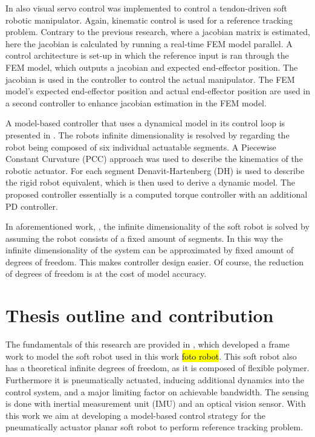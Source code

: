 In \cite{zhang2017visual} also visual servo control was implemented to control a tendon-driven soft robotic manipulator. Again, kinematic control is used for a reference tracking problem. Contrary to the previous research, where a jacobian matrix is estimated, here the jacobian is calculated by running a real-time FEM model parallel. A control architecture is set-up in which the reference input is ran through the FEM model, which outputs a jacobian and expected end-effector position. The jacobian is used in the controller to control the actual manipulator. The FEM model's expected end-effector position and actual end-effector position are used in a second controller to enhance jacobian estimation in the FEM model.

A model-based controller that uses a dynamical model in its control loop is presented in \cite{della2020model}. The robots infinite dimensionality is resolved by regarding the robot being composed of six individual actuatable segments. A Piecewise Constant Curvature (PCC) approach was used to describe the kinematics of the robotic actuator. For each segment Denavit-Hartenberg (DH) is used to describe the rigid robot equivalent, which is then used to derive a dynamic model. The proposed controller essentially is a computed torque controller with an additional PD controller. 

In aforementioned work, \cite{della2020model}, the infinite dimensionality of the soft robot is solved by assuming the robot consists of a fixed amount of segments. In this way the infinite dimensionality of the system can be approximated by fixed amount of degrees of freedom. This makes controller design easier. Of course, the reduction of degrees of freedom is at the cost of model accuracy. 




\section{Thesis outline and contribution}

The fundamentals of this research are provided in  \cite{Caasenbrood2020}, which developed a frame work to model the soft robot used in this work \hl{foto robot}. This soft robot also has a theoretical infinite degrees of freedom, as it is composed of flexible polymer. Furthermore it is pneumatically actuated, inducing additional dynamics into the control system, and a major limiting factor on achievable bandwidth. The sensing is done with inertial measurement unit (IMU) and an optical vision sensor. With this work we aim at developing a model-based control strategy for the pneumatically actuator planar soft robot to perform reference tracking problem. 

